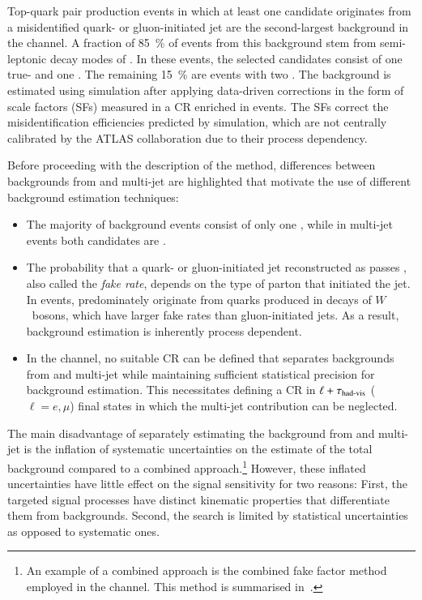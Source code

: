 Top-quark pair production events in which at least one \tauhadvis candidate
originates from a misidentified quark- or gluon-initiated jet are the
second-largest background in the \hadhad channel. A fraction of
\SI{85}{\percent} of events from this background stem from semi-leptonic decay
modes of \ttbar. In these events, the selected \tauhadvis candidates consist of
one true- and one \faketauhadvis. The remaining \SI{15}{\percent} are
\ttbarFakes events with two \faketauhadvis.
The \ttbarFakes background is estimated using simulation after applying
data-driven corrections in the form of \faketauhadvis scale factors (SFs)
measured in a CR enriched in \ttbar events. The SFs correct the \jettotauhadvis
misidentification efficiencies predicted by simulation, which are not centrally
calibrated by the ATLAS collaboration due to their process dependency.

Before proceeding with the description of the method, differences between
\faketauhadvis backgrounds from \ttbar and multi-jet are highlighted that
motivate the use of different background estimation techniques:
\begin{itemize}

\item The majority of \ttbarFakes background events consist of only one
  \faketauhadvis, while in multi-jet events both candidates are \faketauhadvis.

\item The probability that a quark- or gluon-initiated jet reconstructed as
  \tauhadvis passes \tauid, also called the \emph{fake rate}, depends on the
  type of parton that initiated the jet. In \ttbar events, \faketauhadvis
  predominately originate from quarks produced in decays of $W$~bosons, which
  have larger fake rates than gluon-initiated jets. As a result, \faketauhadvis
  background estimation is inherently process dependent.

\item In the \hadhad channel, no suitable \ttbarFakes CR can be defined that
  separates \faketauhadvis backgrounds from \ttbar and multi-jet while
  maintaining sufficient statistical precision for background estimation. This
  necessitates defining a CR in $\ell + \tau_{\text{had-vis}}$ ($\ell = e, \mu$) final
  states in which the multi-jet contribution can be neglected.

\end{itemize}
The main disadvantage of separately estimating the \faketauhadvis background
from \ttbar and multi-jet is the inflation of systematic uncertainties on the
estimate of the total \faketauhadvis background compared to a combined
approach.\footnote{An example of a combined approach is the combined fake factor
  method employed in the \lephad channel. This method is summarised
  in~.}  However, these inflated uncertainties
have little effect on the signal sensitivity for two reasons: First, the
targeted signal processes have distinct kinematic properties that differentiate
them from \faketauhadvis backgrounds. Second, the search is limited by
statistical uncertainties as opposed to systematic ones.



